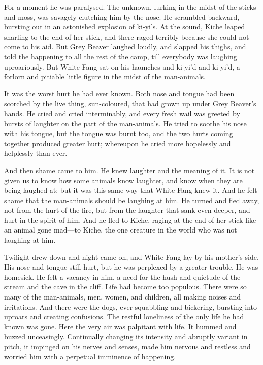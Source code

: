 \documentclass[10pt]{book}
\begin{document}
For a moment he was paralysed. The unknown, lurking in the midst of the
sticks and moss, was savagely clutching him by the nose. He scrambled
backward, bursting out in an astonished explosion of ki-yi’s. At the
sound, Kiche leaped snarling to the end of her stick, and there raged
terribly because she could not come to his aid. But Grey Beaver laughed
loudly, and slapped his thighs, and told the happening to all the rest
of the camp, till everybody was laughing uproariously. But White Fang
sat on his haunches and ki-yi’d and ki-yi’d, a forlorn and pitiable
little figure in the midst of the man-animals.

It was the worst hurt he had ever known. Both nose and tongue had been
scorched by the live thing, sun-coloured, that had grown up under Grey
Beaver’s hands. He cried and cried interminably, and every fresh wail
was greeted by bursts of laughter on the part of the man-animals. He
tried to soothe his nose with his tongue, but the tongue was burnt too,
and the two hurts coming together produced greater hurt; whereupon he
cried more hopelessly and helplessly than ever.

And then shame came to him. He knew laughter and the meaning of it. It
is not given us to know how some animals know laughter, and know when
they are being laughed at; but it was this same way that White Fang
knew it. And he felt shame that the man-animals should be laughing at
him. He turned and fled away, not from the hurt of the fire, but from
the laughter that sank even deeper, and hurt in the spirit of him. And
he fled to Kiche, raging at the end of her stick like an animal gone
mad—to Kiche, the one creature in the world who was not laughing at
him.

Twilight drew down and night came on, and White Fang lay by his
mother’s side. His nose and tongue still hurt, but he was perplexed by
a greater trouble. He was homesick. He felt a vacancy in him, a need
for the hush and quietude of the stream and the cave in the cliff. Life
had become too populous. There were so many of the man-animals, men,
women, and children, all making noises and irritations. And there were
the dogs, ever squabbling and bickering, bursting into uproars and
creating confusions. The restful loneliness of the only life he had
known was gone. Here the very air was palpitant with life. It hummed
and buzzed unceasingly. Continually changing its intensity and abruptly
variant in pitch, it impinged on his nerves and senses, made him
nervous and restless and worried him with a perpetual imminence of
happening.
\end{document}
